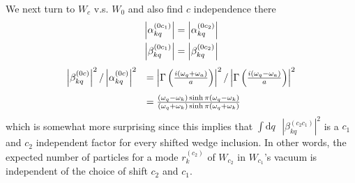 \documentclass[12pt,a4paper]{article}
\newcommand{\dv}[1]{\mathrm{d} #1 \text{ }}
\begin{document}
We next turn to $W_c$ v.s. $W_0$ and also find $c$ independence there 
\begin{equation}
  \begin{array}{c}
    \left|\alpha_{kq}^{(0c_1)}\right| = \left|\alpha_{kq}^{(0c_2)}\right| \vspace{4pt}\\
    \left|\beta_{kq}^{(0c_1)}\right| = \left|\beta_{kq}^{(0c_2)}\right| \\
  \end{array}
\end{equation}
\begin{equation}
  \begin{array}{ll}
      \left|\beta_{kq}^{(0c)}\right|^2 / \left|\alpha_{kq}^{(0c)}\right|^2 \vspace{4pt} &= \left|\Gamma\left(\frac{i(\omega_q + \omega_a)}{a}\right)\right|^2 / \left|\Gamma\left(\frac{i(\omega_q - \omega_a)}{a}\right)\right|^2 \vspace{4pt} \\
  & = \frac{(\omega_q - \omega_k) \sinh \pi (\omega_q - \omega_k)}{(\omega_q + \omega_k) \sinh \pi (\omega_q + \omega_k)} \\
  \end{array}
  \label{nonzero_ratio}
\end{equation}
which is somewhat more surprising since this implies that $\int \dv{q} \left|\beta_{kq}^{(c_2c_1)}\right|^2$ is a $c_1$ and $c_2$ independent factor  for every shifted wedge inclusion.  In other words, the expected number of particles for a mode $r^{(c_2)}_k$ of $W_{c_2}$ in $W_{c_1}$'s vacuum is independent of the choice of shift $c_2$ and $c_1$.
\end{document}
